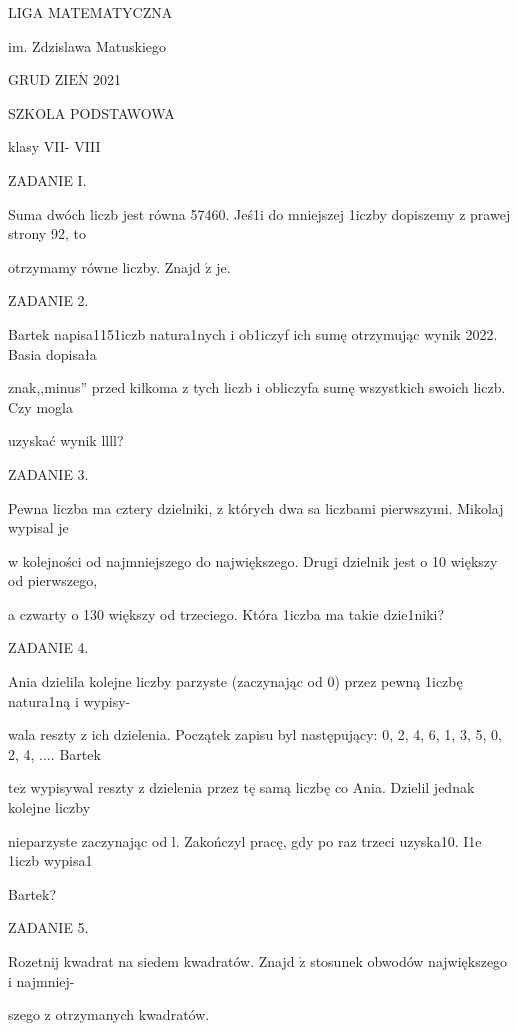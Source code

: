 \documentclass[a4paper,12pt]{article}
\begin{document}
LIGA MATEMATYCZNA

im. Zdzislawa Matuskiego

GRUD Z$\mathrm{I}\mathrm{E}\acute{\mathrm{N}}$ 2021

SZKOLA PODSTAWOWA

klasy VII- VIII

ZADANIE I.

Suma dwóch liczb jest równa 57460. Jeś1i do mniejszej 1iczby dopiszemy z prawej strony 92, to

otrzymamy równe liczby. Znajd $\acute{\mathrm{z}}$ je.

ZADANIE 2.

Bartek napisa1151iczb natura1nych i ob1iczyf ich sumę otrzymując wynik 2022. Basia dopisała

znak,,minus'' przed kilkoma z tych liczb i obliczyfa sumę wszystkich swoich liczb. Czy mogla

uzyskać wynik llll?

ZADANIE 3.

Pewna liczba ma cztery dzielniki, z których dwa sa liczbami pierwszymi. Mikolaj wypisal je

w kolejności od najmniejszego do największego. Drugi dzielnik jest o 10 większy od pierwszego,

a czwarty o 130 większy od trzeciego. Która 1iczba ma takie dzie1niki?

ZADANIE 4.

Ania dzielila kolejne liczby parzyste (zaczynając od 0) przez pewną 1iczbę natura1ną i wypisy-

wala reszty z ich dzielenia. Początek zapisu byl następujący: 0, 2, 4, 6, 1, 3, 5, 0, 2, 4, $\ldots$. Bartek

$\mathrm{t}\mathrm{e}\dot{\mathrm{z}}$ wypisywal reszty z dzielenia przez tę samą liczbę co Ania. Dzielil jednak kolejne liczby

nieparzyste zaczynając od l. Zakończyl pracę, gdy po raz trzeci uzyska10. I1e 1iczb wypisa1

Bartek?

ZADANIE 5.

Rozetnij kwadrat na siedem kwadratów. Znajd $\acute{\mathrm{z}}$ stosunek obwodów największego i najmniej-

szego z otrzymanych kwadratów.
\end{document}
